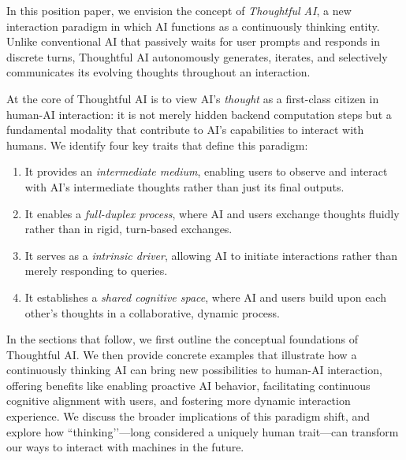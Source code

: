 In this position paper, we envision the concept of \textit{Thoughtful AI}, a new interaction paradigm in which AI functions as a continuously thinking entity. 
Unlike conventional AI that passively waits for user prompts and responds in discrete turns, Thoughtful AI autonomously generates, iterates, and selectively communicates its evolving thoughts throughout an interaction. 


At the core of Thoughtful AI is to view AI's \textit{thought} as a first-class citizen in human-AI interaction: it is not merely hidden backend computation steps but a fundamental modality that contribute to AI's capabilities to interact with humans. 
We identify four key traits that define this paradigm:
\begin{enumerate} 
    \item It provides an \textit{intermediate medium}, enabling users to observe and interact with AI’s intermediate thoughts rather than just its final outputs. 
    \item It enables a \textit{full-duplex process}, where AI and users exchange thoughts fluidly rather than in rigid, turn-based exchanges. 
    \item It serves as a \textit{intrinsic driver}, allowing AI to initiate interactions rather than merely responding to queries. 
    \item It establishes a \textit{shared cognitive space}, where AI and users build upon each other’s thoughts in a collaborative, dynamic process.
\end{enumerate}


In the sections that follow, we first outline the conceptual foundations of Thoughtful AI.
We then provide concrete examples that illustrate how a continuously thinking AI can bring new possibilities to human-AI interaction, offering benefits like enabling proactive AI behavior, facilitating continuous cognitive alignment with users, and fostering more dynamic interaction experience.
We discuss the broader implications of this paradigm shift, and explore how ``thinking’’---long considered a uniquely human trait---can transform our ways to interact with machines in the future.







